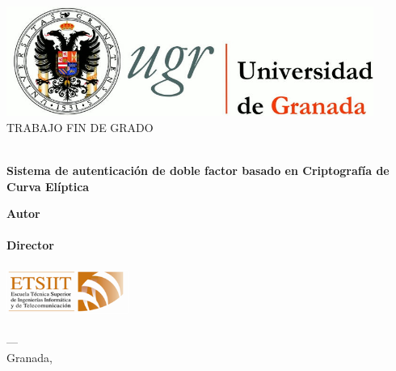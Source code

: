 \begin{titlepage}
    \newlength{\centeroffset}
    \setlength{\centeroffset}{-0.5\oddsidemargin}
    \addtolength{\centeroffset}{0.5\evensidemargin}
    \thispagestyle{empty}

    \noindent\hspace*{\centeroffset}\begin{minipage}{\textwidth}

        \centering
        \includegraphics[width=0.9\textwidth]{imagenes/logo_ugr.jpg}\\[1.4cm]

        \textsc{\Large TRABAJO FIN DE GRADO\\[0.2cm]}
        \textsc{\myDegree\\[1cm]}

        {\Huge\bfseries Sistema de autenticación de doble factor basado en Criptografía de Curva Elíptica\\}
    \end{minipage}

    \vspace{1.5cm}

    \noindent\hspace*{\centeroffset}\begin{minipage}{\textwidth}
        \centering

        \textbf{Autor}\\ {\myName}\\[2.5ex]
        \textbf{Director}\\ {\myProf}\\[2cm]
        \includegraphics[width=0.3\textwidth]{imagenes/etsiit_logo.png}\\[0.1cm]
        \textsc{\myFaculty}\\
        \textsc{---}\\
        Granada, \myTime
    \end{minipage}
\end{titlepage}